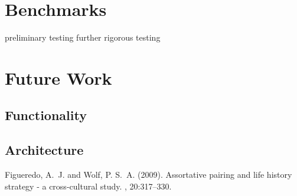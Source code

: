 \documentclass[twoside]{article}
\begin{document}
\section{Benchmarks}
preliminary testing 
further rigorous testing 



\section{Future Work}

\subsection{Functionality}

\subsection{Architecture}


\begin{thebibliography}{99} %

Figueredo, A.~J. and Wolf, P. S.~A. (2009).
\newblock Assortative pairing and life history strategy - a cross-cultural
  study.
, 20:317--330.
 
\end{thebibliography}

\end{document}
